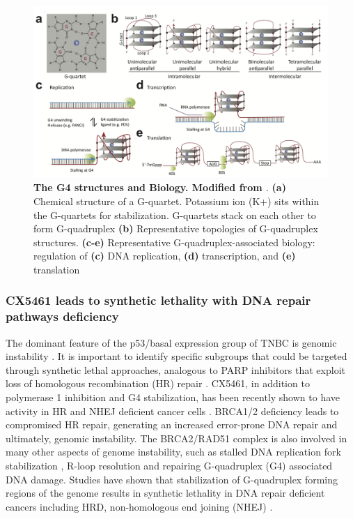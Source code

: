  \begin{figure}
\centering
\includegraphics[width=\textwidth]{Figures/chap1/G4structures.png}
	\caption[The G4 structures and their biology]
	{\small
	    \textbf{The G4 structures and Biology. Modified from \cite{kwok2017g}}.
	   \textbf{(a)} Chemical structure of a G-quartet. Potassium ion (K+) sits within the G-quartets for stabilization. G-quartets stack on each other to form G-quadruplex \textbf{(b)} Representative topologies of G-quadruplex structures. \textbf{(c-e)} Representative G-quadruplex-associated biology: regulation of \textbf{(c)} DNA replication, \textbf{(d)} transcription, and \textbf{(e)} translation
	}
	\label{fig:G4structures}
\end{figure}
 
 \subsubsection{CX5461 leads to synthetic lethality with  DNA repair pathways deficiency}
 The dominant feature of the p53/basal expression group of TNBC is genomic instability \cite{yu2013identification}. It is important to identify specific subgroups that could be targeted through synthetic lethal approaches, analogous to PARP inhibitors that exploit loss of homologous recombination (HR) repair  \cite{fong2009inhibition}.
 CX5461, in addition to polymerase 1 inhibition and G4 stabilization, has been recently shown to have activity in \ac{HR} and \ac{NHEJ} deficient cancer cells \cite{zimmer2016targeting,xu2017cx}. 
 BRCA1/2 deficiency leads to compromised HR repair, generating an increased error-prone DNA repair and ultimately, genomic instability. The BRCA2/RAD51 complex is also involved in many other aspects of genome instability, such as stalled DNA replication fork stabilization \cite{schlacher2011double}, R-loop resolution \cite{bhatia2014brca2} and repairing G-quadruplex (G4) associated DNA damage.
 Studies have shown that stabilization of G-quadruplex forming regions of the genome results in synthetic lethality in DNA repair deficient cancers including HRD, non-homologous end joining (NHEJ) \cite{xu2017cx, mcluckie2013g, zimmer2016targeting}. 
  
